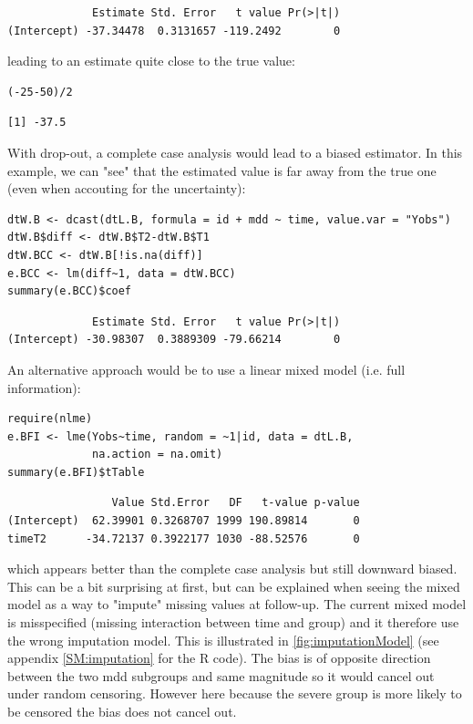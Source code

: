 \documentclass[12pt]{article}
\begin{document}
\begin{verbatim}
             Estimate Std. Error   t value Pr(>|t|)
(Intercept) -37.34478  0.3131657 -119.2492        0
\end{verbatim}


\clearpage

leading to an estimate quite close to the true value:
\lstset{language=r,label= ,caption= ,captionpos=b,numbers=none}
\begin{lstlisting}
(-25-50)/2
\end{lstlisting}

\begin{verbatim}
[1] -37.5
\end{verbatim}



With drop-out, a complete case analysis would lead to a biased
estimator. In this example, we can "see" that the estimated value is
far away from the true one (even when accouting for the uncertainty):
\lstset{language=r,label= ,caption= ,captionpos=b,numbers=none}
\begin{lstlisting}
dtW.B <- dcast(dtL.B, formula = id + mdd ~ time, value.var = "Yobs")
dtW.B$diff <- dtW.B$T2-dtW.B$T1
dtW.BCC <- dtW.B[!is.na(diff)]
e.BCC <- lm(diff~1, data = dtW.BCC)
summary(e.BCC)$coef
\end{lstlisting}

\begin{verbatim}
             Estimate Std. Error   t value Pr(>|t|)
(Intercept) -30.98307  0.3889309 -79.66214        0
\end{verbatim}


An alternative approach would be to use a linear mixed model
(i.e. full information):
\lstset{language=r,label= ,caption= ,captionpos=b,numbers=none}
\begin{lstlisting}
require(nlme)
e.BFI <- lme(Yobs~time, random = ~1|id, data = dtL.B,
             na.action = na.omit)
summary(e.BFI)$tTable
\end{lstlisting}

\begin{verbatim}
                Value Std.Error   DF   t-value p-value
(Intercept)  62.39901 0.3268707 1999 190.89814       0
timeT2      -34.72137 0.3922177 1030 -88.52576       0
\end{verbatim}

which appears better than the complete case analysis but still
downward biased. This can be a bit surprising at first, but can be
explained when seeing the mixed model as a way to "impute" missing
values at follow-up. The current mixed model is misspecified (missing
interaction between time and group) and it therefore use the wrong
imputation model. This is illustrated in \autoref{fig:imputationModel}
(see appendix \ref{SM:imputation} for the R code). The bias is of opposite
direction between the two mdd subgroups and same magnitude so it would
cancel out under random censoring. However here because the severe
group is more likely to be censored the bias does not cancel out.
\end{document}
